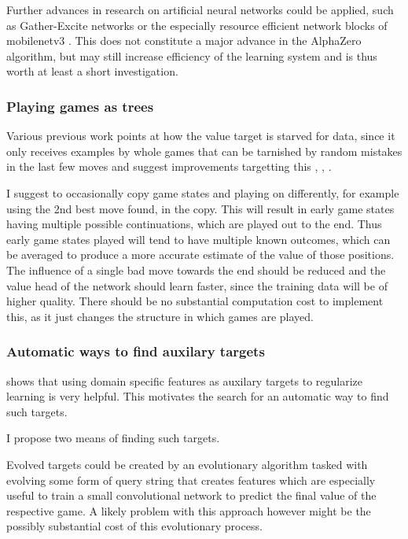 \documentclass[12pt,onecolumn,oneside,titlepage]{article}
\begin{document}
Further advances in research on artificial neural networks could be applied, such as Gather-Excite networks \cite{DBLP:journals/corr/abs-1810-12348} or the especially resource efficient network blocks of mobilenetv3 \cite{howard2019searching}.
This does not constitute a major advance in the AlphaZero algorithm, but may still increase efficiency of the learning system and is thus worth at least a short investigation.

\subsubsection{Playing games as trees}

Various previous work points at how the value target is starved for data, since it only receives examples by whole games that can be tarnished by random mistakes in the last few moves and suggest improvements targetting this \cite{wu2019accelerating}, \cite{oracledevs6}, \cite{lan2019multiple}.

I suggest to occasionally copy game states and playing on differently, for example using the 2nd best move found, in the copy.
This will result in early game states having multiple possible continuations, which are played out to the end. Thus early game states played will tend to have multiple known outcomes,
which can be averaged to produce a more accurate estimate of the value of those positions. The influence of a single bad move towards the end should be reduced and the value head of the network should learn faster, since the training data will be of higher quality.
There should be no substantial computation cost to implement this, as it just changes the structure in which games are played.

\subsubsection{Automatic ways to find auxilary targets}

\cite{wu2019accelerating} shows that using domain specific features as auxilary targets to regularize learning is very helpful. This motivates the search for an automatic way to find such targets.

I propose two means of finding such targets.

Evolved targets could be created by an evolutionary algorithm tasked with evolving some form of query string that creates features which are especially useful to train a small convolutional network to predict the final value of the respective game.
A likely problem with this approach however might be the possibly substantial cost of this evolutionary process.
\end{document}
